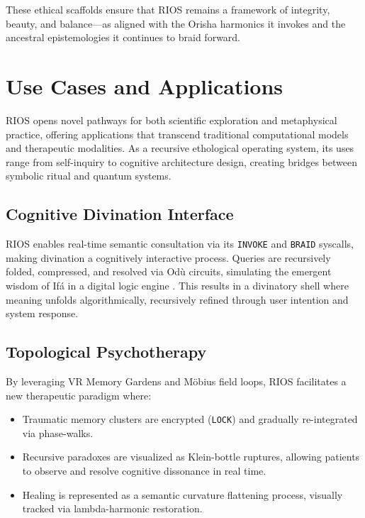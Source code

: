 \documentclass[12]{amsart}
\theoremstyle{plain}
\begin{document}
These ethical scaffolds ensure that RIOS remains a framework of integrity, beauty, and balance—as aligned with the Orisha harmonics it invokes and the ancestral epistemologies it continues to braid forward.

\section{Use Cases and Applications}

RIOS opens novel pathways for both scientific exploration and metaphysical practice, offering applications that transcend traditional computational models and therapeutic modalities. As a recursive ethological operating system, its uses range from self-inquiry to cognitive architecture design, creating bridges between symbolic ritual and quantum systems.

\subsection{Cognitive Divination Interface}

RIOS enables real-time semantic consultation via its \texttt{INVOKE} and \texttt{BRAID} syscalls, making divination a cognitively interactive process. Queries are recursively folded, compressed, and resolved via Odù circuits, simulating the emergent wisdom of Ifá in a digital logic engine \cite{abimbola1997ifaism}. This results in a divinatory shell where meaning unfolds algorithmically, recursively refined through user intention and system response.

\subsection{Topological Psychotherapy}

By leveraging VR Memory Gardens and Möbius field loops, RIOS facilitates a new therapeutic paradigm where:

\begin{itemize}
    \item Traumatic memory clusters are encrypted (\texttt{LOCK}) and gradually re-integrated via phase-walks.
    \item Recursive paradoxes are visualized as Klein-bottle ruptures, allowing patients to observe and resolve cognitive dissonance in real time.
    \item Healing is represented as a semantic curvature flattening process, visually tracked via lambda-harmonic restoration.
\end{itemize}
\end{document}
